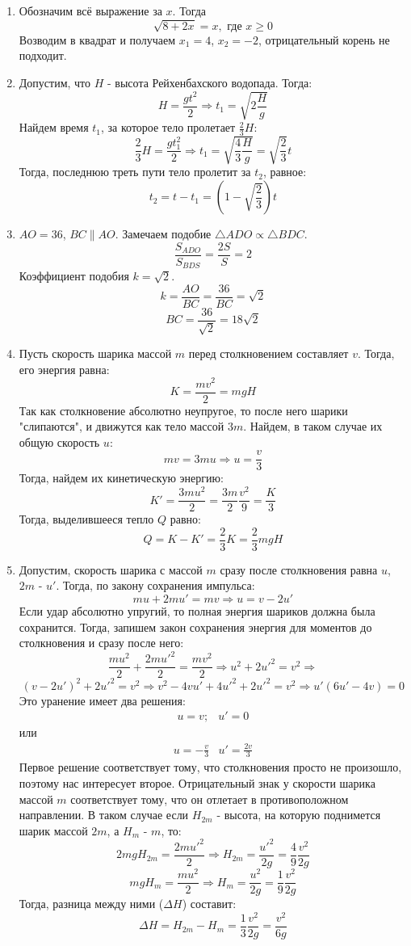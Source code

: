\documentclass[12pt]{article} %
\begin{document}
\begin{enumerate}
\item Обозначим всё выражение за $x$. Тогда
\[
\sqrt{8 + 2x} = x, \text{ где } x\geq 0     
\]
Возводим в квадрат и получаем $x_1 = 4$, $x_2 = -2$, отрицательный корень не подходит. 
\item Допустим, что $H$ - высота Рейхенбахского водопада. Тогда:
\[ H = \frac{gt^2}{2} \Rightarrow t_1 = \sqrt{2\frac{H}{g}} \]
Найдем время $t_1$, за которое тело пролетает $\frac{2}{3}H$:
\[ \frac{2}{3}H = \frac{gt_1^2}{2} \Rightarrow t_1 = \sqrt{\frac{4}{3}\frac{H}{g}} = \sqrt{\frac{2}{3}} t \]
Тогда, последнюю треть пути тело пролетит за $t_2$, равное:
\[t_2 = t - t_1 = \left( 1 - \sqrt{\frac{2}{3}} \right) t \]
\item $AO=36$, $BC\parallel AO$. Замечаем подобие $\triangle ADO \propto \triangle BDC$. 
\[
\frac{S_{ADO}}{S_{BDS}} = \frac{2S}{S} = 2    
\]
Коэффициент подобия $k = \sqrt{2}$. 
\[
k = \frac{AO}{BC} = \frac{36}{BC} = \sqrt{2}    
\]
\[
BC = \frac{36}{\sqrt{2}} = 18 \sqrt{2}    
\]
\item Пусть скорость шарика массой $m$ перед столкновением составляет $v$. Тогда, его энергия равна: 
\[K = \frac{mv^2}{2} = mgH \] 
Так как столкновение абсолютно неупругое, то после него шарики  "слипаются", и движутся как тело массой $3m$. Найдем, в таком случае их общую скорость $u$:
\[ mv = 3mu \Rightarrow u = \frac{v}{3} \]
Тогда, найдем их кинетическую энергию:
\[K' =  \frac{3mu^2}{2} = \frac{3m}{2} \frac{v^2}{9}= \frac{K}{3} \]
Тогда, выделившееся тепло $Q$ равно:
\[ Q = K - K' = \frac{2}{3} K =\frac{2}{3} mgH \]
\item Допустим, скорость шарика с массой $m$ сразу после столкновения равна $u$, $2m$ - $u'$. Тогда, по закону сохранения импульса:
\[ mu + 2mu' = mv \Rightarrow u = v - 2u' \]
Если удар абсолютно упругий, то полная энергия шариков должна была сохранится. Тогда, запишем закон сохранения энергия для моментов до столкновения и сразу после него:
\[ \frac{mu^2}{2} + \frac{2mu'^2}{2} = \frac{mv^2}{2} \Rightarrow u^2 + 2u'^2 = v^2 \Rightarrow \]
\[ (v - 2u')^2 + 2u'^2 = v^2 \Rightarrow v^2 - 4vu' + 4u'^2 + 2u'^2 = v^2 \Rightarrow u'(6u' - 4v) = 0 \]
Это уранение имеет два решения:
\[ \begin{array} {cc}
u = v; & u' = 0 
\end{array} \] 
или
\[
\begin{array} {cc}
u = -\frac{v}{3} & u' = \frac{2v}{3}
\end{array}
 \]
Первое решение соответствует тому, что столкновения просто не произошло, поэтому нас интересует второе. Отрицательный знак у скорости шарика массой $m$ соответствует тому, что он отлетает в противоположном направлении. В таком случае если $H_{2m}$ - высота, на которую поднимется шарик массой ${2m}$, а ${H_m}$ - $m$, то:
\[ 2mgH_{2m} = \frac{2mu'^2}{2} \Rightarrow H_{2m} = \frac{u'^2}{2g} = \frac{4}{9}\frac{v^2}{2g}  \]
\[ mgH_{m} = \frac{mu^2}{2} \Rightarrow H_{m} = \frac{u^2}{2g} = \frac{1}{9}\frac{v^2}{2g}  \]
Тогда, разница между ними ($\Delta H$) составит:
\[ \Delta H = H_{2m} - H_{m} = \frac{1}{3} \frac{v^2}{2g} = \frac{v^2}{6g} \]
\end{enumerate}
\end{document}
